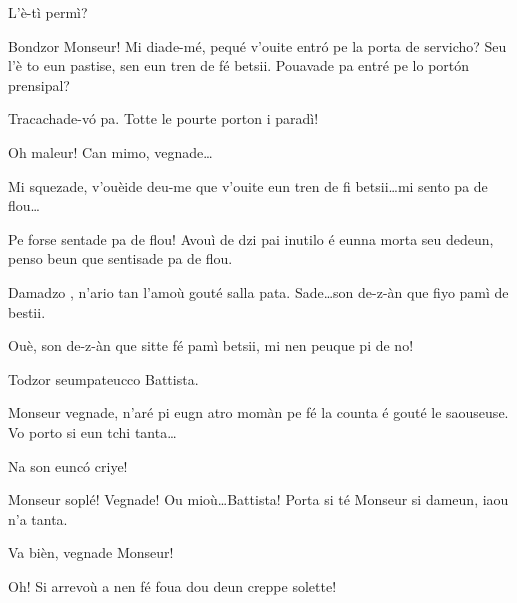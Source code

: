 \begin{drama}


\Preyespeaks L’è-tì permì? 

\Cesarspeaks  Bondzor Monseur! Mi diade-mé, pequé v'ouite entr\'o pe la porta de servicho? Seu l'è to eun pastise, sen eun tren de fé betsii. Pouavade pa entré pe lo port\'on prensipal?

\Preyespeaks Tracachade-v\'o pa. Totte le pourte porton i paradì!

\Cesarspeaks{} Oh maleur! Can mimo, vegnade\ldots

\Preyespeaks{} Mi squezade, v'ouèide deu-me que v'ouite eun tren de fi betsii\ldots mi sento pa de flou\ldots

\Hermannspeaks{} Pe forse sentade pa de flou! Avouì de dzi pai inutilo é eunna morta seu dedeun, penso beun que sentisade pa de flou.

\Preyespeaks Damadzo \tristee, n’ario tan l'amoù gouté salla pata. Sade\ldots son de-z-àn que fiyo pamì de bestii.

\Battistaspeaks  Ouè, son de-z-àn que sitte fé pamì betsii, mi nen peuque pi de no! 


\Preyespeaks{} Todzor seumpateucco Battista.

\Cesarspeaks  Monseur vegnade, n’aré pi eugn atro momàn pe fé la counta é gouté le saouseuse. Vo porto si eun tchi tanta\ldots


\Preyespeaks Na son eunc\'o criye!

\Cesarspeaks Monseur soplé! Vegnade! Ou mioù\ldots Battista! Porta si té Monseur si dameun, iaou n'a tanta.

\Battistaspeaks Va bièn, vegnade Monseur!

\Cesarspeaks Oh! Si arrevoù a nen fé foua dou deun creppe solette!


\ridocliou

\scene[-- La mii? ]



\end{drama}
